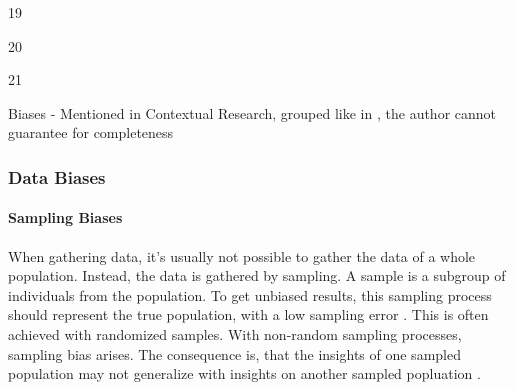 \documentclass[12pt, a4paper, oneside]{book}   	%
\begin{document}
\begin{table}[H]
\begin{threeparttable}
\begin{tablenotes}
\begin{minipage}{0.33\textwidth}
							\item[19] \autocite{Chakraborty_2024}
							\item[20] \autocite{Young_2020}
							\item[21] \autocite{Montoya_2025}
						\end{minipage}%
					\end{tablenotes}
				\end{threeparttable}
				\caption{Biases - Mentioned in Contextual Research, grouped like in \cite{Mehrabi_2021}, the author cannot guarantee for completeness}
				\label{tab:biases_types}
			\end{table}
			
			\subsubsection{Data Biases}
				
				\paragraph{Sampling Biases \autocite{Mehrabi_2021} \autocite{Chakraborty_2024}}		
				When gathering data, it's usually not possible to gather the data of a whole population. Instead, the data is gathered by sampling. A sample is a subgroup of individuals from the population. To get unbiased results, this sampling process should represent the true population, with a low sampling error \autocites{HP_2022}. This is often achieved with randomized samples. With non-random sampling processes, sampling bias arises. The consequence is, that the insights of one sampled population may not generalize with insights on another sampled popluation \autocite{Mehrabi_2021}.
				
\end{document}
